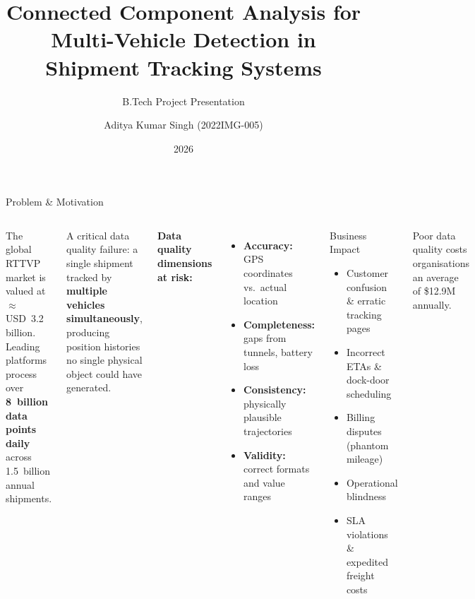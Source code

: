 \documentclass[aspectratio=169,xcolor=dvipsnames,9pt]{beamer}
\title[Multi-Vehicle Detection]{Connected Component Analysis for\\Multi-Vehicle Detection in Shipment Tracking Systems}
\subtitle{B.Tech Project Presentation}
\author{Aditya Kumar Singh (2022IMG-005)}
\institute
{
    Under the supervision of \textbf{Prof.\ Kiran Kumar Pattanaik} \\[4pt]
    Department of Information Technology \\
    ABV Indian Institute of Information Technology and Management, Gwalior
}
\date{2026}
\begin{document}
\begin{frame}
    \titlepage
\end{frame}

\begin{frame}{Problem \& Motivation}
    \begin{columns}[T]
        The global RTTVP market is valued at $\approx$USD~3.2 billion. Leading platforms process over \textbf{8~billion data points daily} across 1.5~billion annual shipments.

        \vspace{0.4em}
        A critical data quality failure: a single shipment tracked by \textbf{multiple vehicles simultaneously}, producing position histories no single physical object could have generated.

        \vspace{0.4em}
        \textbf{Data quality dimensions at risk:}
        \begin{itemize}
            \item \textbf{Accuracy:} GPS coordinates vs.\ actual location
            \item \textbf{Completeness:} gaps from tunnels, battery loss
            \item \textbf{Consistency:} physically plausible trajectories
            \item \textbf{Validity:} correct formats and value ranges
        \end{itemize}

        \begin{alertblock}{Business Impact}
            \begin{itemize}
                \item Customer confusion \& erratic tracking pages
                \item Incorrect ETAs \& dock-door scheduling
                \item Billing disputes (phantom mileage)
                \item Operational blindness
                \item SLA violations \& expedited freight costs
            \end{itemize}
        \end{alertblock}

        \vspace{0.3em}
        {\footnotesize Poor data quality costs organisations an average of \$12.9M annually.}
    \end{columns}
\end{frame}
\end{document}
